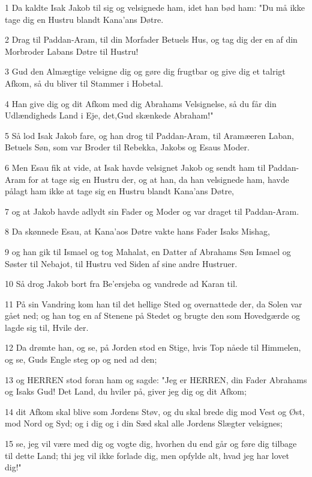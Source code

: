 \par 1 Da kaldte Isak Jakob til sig og velsignede ham, idet han bød ham: "Du må ikke tage dig en Hustru blandt Kana'ans Døtre.
\par 2 Drag til Paddan-Aram, til din Morfader Betuels Hus, og tag dig der en af din Morbroder Labans Døtre til Hustru!
\par 3 Gud den Almægtige velsigne dig og gøre dig frugtbar og give dig et talrigt Afkom, så du bliver til Stammer i Hobetal.
\par 4 Han give dig og dit Afkom med dig Abrahams Velsignelse, så du får din Udlændigheds Land i Eje, det,Gud skænkede Abraham!"
\par 5 Så lod Isak Jakob fare, og han drog til Paddan-Aram, til Aramæeren Laban, Betuels Søn, som var Broder til Rebekka, Jakobs og Esaus Moder.
\par 6 Men Esau fik at vide, at Isak havde velsignet Jakob og sendt ham til Paddan-Aram for at tage sig en Hustru der, og at han, da han velsignede ham, havde pålagt ham ikke at tage sig en Hustru blandt Kana'ans Døtre,
\par 7 og at Jakob havde adlydt sin Fader og Moder og var draget til Paddan-Aram.
\par 8 Da skønnede Esau, at Kana'aos Døtre vakte hans Fader Isaks Mishag,
\par 9 og han gik til Ismael og tog Mahalat, en Datter af Abrahams Søn Ismael og Søster til Nebajot, til Hustru ved Siden af sine andre Hustruer.
\par 10 Så drog Jakob bort fra Be'ersjeba og vandrede ad Karan til.
\par 11 På sin Vandring kom han til det hellige Sted og overnattede der, da Solen var gået ned; og han tog en af Stenene på Stedet og brugte den som Hovedgærde og lagde sig til, Hvile der.
\par 12 Da drømte han, og se, på Jorden stod en Stige, hvis Top nåede til Himmelen, og se, Guds Engle steg op og ned ad den;
\par 13 og HERREN stod foran ham og sagde: "Jeg er HERREN, din Fader Abrahams og Isaks Gud! Det Land, du hviler på, giver jeg dig og dit Afkom;
\par 14 dit Afkom skal blive som Jordens Støv, og du skal brede dig mod Vest og Øst, mod Nord og Syd; og i dig og i din Sæd skal alle Jordens Slægter velsignes;
\par 15 se, jeg vil være med dig og vogte dig, hvorhen du end går og føre dig tilbage til dette Land; thi jeg vil ikke forlade dig, men opfylde alt, hvad jeg har lovet dig!"
